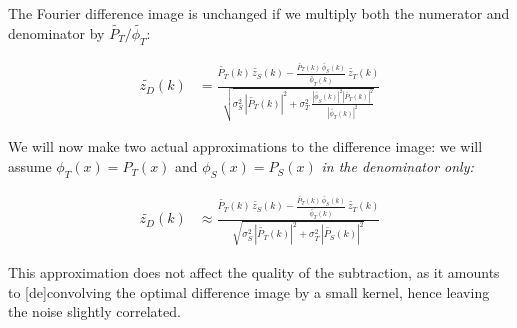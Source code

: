 \documentclass[DM,authoryear,toc]{lsstdoc}
\begin{document}
The Fourier difference image is unchanged if we multiply both the numerator and denominator by $\widetilde{P_T}/\widetilde{\phi_T}$:

\begin{align}
  \widetilde{z_D}(k) & = \frac{
    \widetilde{P_T}(k) \, \widetilde{z_S}(k)
    - \frac{
        \widetilde{P_T}(k) \, \widetilde{\phi_S}(k)
      }{
        \widetilde{\phi_T}(k)
      }\, \widetilde{z_T}(k)
  }{
    \sqrt{
      \sigma_S^2 \, \left|\widetilde{P_T}(k)\right|^2
      + \sigma_T^2 \, \frac{
        \left|\widetilde{\phi_S}(k)\right|^2
        \left|\widetilde{P_T}(k)\right|^2
      }{
        \left|\widetilde{\phi_T}(k)\right|^2
      }
    }
  }
\end{align}

We will now make two actual approximations to the difference image: we will assume $\phi_T(x) = P_T(x)$ and $\phi_S(x) = P_S(x)$ \emph{in the denominator only:}

\begin{align}
  \widetilde{z_D}(k) & \approx \frac{
    \widetilde{P_T}(k) \, \widetilde{z_S}(k)
    - \frac{
        \widetilde{P_T}(k) \, \widetilde{\phi_S}(k)
      }{
        \widetilde{\phi_T}(k)
      }\, \widetilde{z_T}(k)
  }{
    \sqrt{
      \sigma_S^2 \, \left|\widetilde{P_T}(k)\right|^2
      + \sigma_T^2 \, \left|\widetilde{P_S}(k)\right|^2
    }
  }
\end{align}

This approximation does not affect the quality of the subtraction, as it amounts to [de]convolving the optimal difference image by a small kernel, hence leaving the noise slightly correlated.
\end{document}
